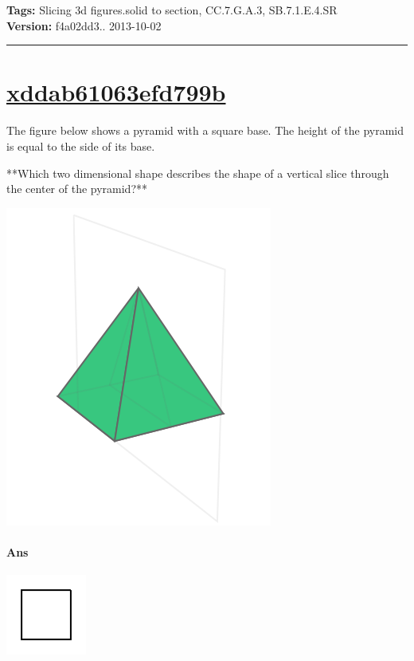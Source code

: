 \documentclass[twocolumn,10pt]{article}
\def\shrinkfactor{0.55}
\begin{document}
\medskip
\noindent
\textbf{Tags:} {\footnotesize Slicing 3d figures.solid to section, CC.7.G.A.3, SB.7.1.E.4.SR}\\
\textbf{Version:} f4a02dd3.. 2013-10-02
\smallskip\hrule





\section{\href{https://www.khanacademy.org/devadmin/content/items/xddab61063efd799b}{xddab61063efd799b}}

\noindent
The figure below shows a pyramid with a square base. The height of the pyramid is equal to the side of its base. 

**Which two dimensional shape describes the shape of a vertical slice through the center of the  pyramid?**  


\includegraphics[scale=\shrinkfactor]{figures/5886f271642379937f772874924e3bcee68b664a.png}

\paragraph{Ans} 


\includegraphics[scale=\shrinkfactor]{figures/4b59a0ece6acc7c19c389e1de534d1df93bf1169.png}
\end{document}
